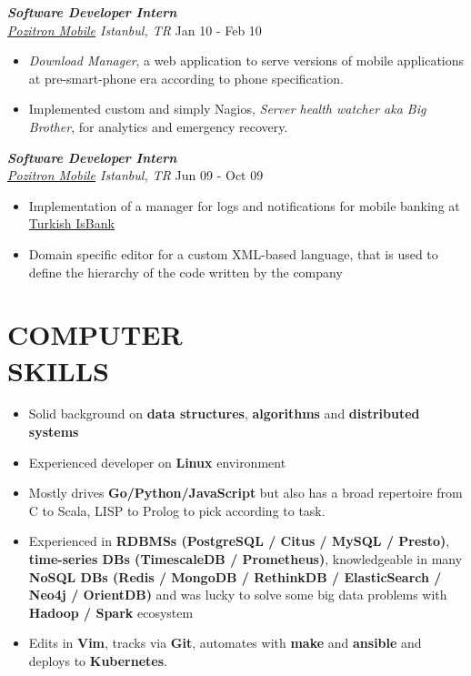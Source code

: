 \documentclass[line, margin]{res}
\begin{document}
\begin{resume}
{\sl \textbf{Software Developer Intern} \\ \href{http://www.pozitron.com/}{Pozitron Mobile} Istanbul, TR} \hfill Jan 10 - Feb 10 \\
\vspace{-0.3cm}
\begin{itemize} \itemsep -2pt
  \item \textit{Download Manager}, a web application to serve versions of mobile applications at pre-smart-phone era according to phone specification.
  \item Implemented custom and simply Nagios, \textit{Server health watcher aka Big Brother}, for analytics and emergency recovery.
\end{itemize}

{\sl \textbf{Software Developer Intern} \\ \href{http://www.pozitron.com/}{Pozitron Mobile} Istanbul, TR} \hfill Jun 09 - Oct 09\\
\vspace{-0.3cm}
\begin{itemize} \itemsep -2pt
  \item Implementation of a manager for logs and notifications for mobile banking at \href{http://www.isbank.com.tr/English/}{Turkish IsBank}
  \item Domain specific editor for a custom XML-based language, that is used to define the hierarchy of the code written by the company
\end{itemize}

\section{COMPUTER \\ SKILLS}
\begin{itemize}
  \item Solid background on \textbf{data structures}, \textbf{algorithms} and \textbf{distributed systems}
  \item Experienced developer on \textbf{Linux} environment
  \item Mostly drives \textbf{Go/Python/JavaScript} but also has a broad repertoire from C to Scala, LISP to Prolog to pick according to task.
  \item Experienced in \textbf{RDBMSs (PostgreSQL / Citus / MySQL / Presto)},
  \textbf{time-series DBs (TimescaleDB / Prometheus)}, knowledgeable in many \textbf{NoSQL DBs (Redis / MongoDB / RethinkDB / ElasticSearch / Neo4j / OrientDB)} and was lucky to solve some big data problems with \textbf{Hadoop / Spark} ecosystem
  \item Edits in \textbf{Vim}, tracks via \textbf{Git}, automates with \textbf{make} and \textbf{ansible} and deploys to \textbf{Kubernetes}.
\end{itemize}


\end{resume}
\end{document}
